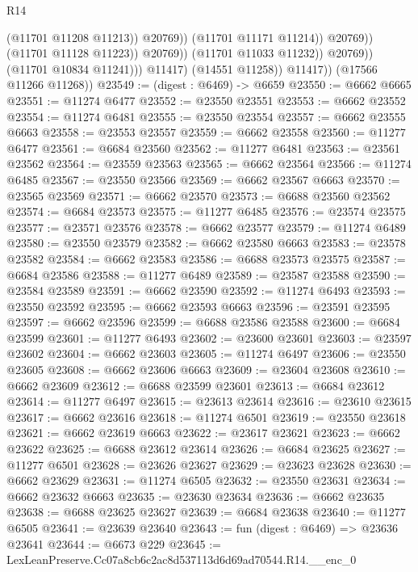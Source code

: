 \begin{lexlean}{R14}
\begin{coremodule}
                                          (@11701 @11208 @11213))
                                        @20769))
                                    (@11701 @11171 @11214))
                                  @20769))
                              (@11701 @11128 @11223))
                            @20769))
                        (@11701 @11033 @11232))
                      @20769))
                  (@11701 @10834 @11241)))
              @11417)
            (@14551 @11258))
          @11417))
      (@17566 @11266 @11268))
@23549 := (digest : @6469) -> @6659
@23550 := @6662 @6665
@23551 := @11274 @6477
@23552 := @23550 @23551
@23553 := @6662 @23552
@23554 := @11274 @6481
@23555 := @23550 @23554
@23557 := @6662 @23555 @6663
@23558 := @23553 @23557
@23559 := @6662 @23558
@23560 := @11277 @6477
@23561 := @6684 @23560
@23562 := @11277 @6481
@23563 := @23561 @23562
@23564 := @23559 @23563
@23565 := @6662 @23564
@23566 := @11274 @6485
@23567 := @23550 @23566
@23569 := @6662 @23567 @6663
@23570 := @23565 @23569
@23571 := @6662 @23570
@23573 := @6688 @23560 @23562
@23574 := @6684 @23573
@23575 := @11277 @6485
@23576 := @23574 @23575
@23577 := @23571 @23576
@23578 := @6662 @23577
@23579 := @11274 @6489
@23580 := @23550 @23579
@23582 := @6662 @23580 @6663
@23583 := @23578 @23582
@23584 := @6662 @23583
@23586 := @6688 @23573 @23575
@23587 := @6684 @23586
@23588 := @11277 @6489
@23589 := @23587 @23588
@23590 := @23584 @23589
@23591 := @6662 @23590
@23592 := @11274 @6493
@23593 := @23550 @23592
@23595 := @6662 @23593 @6663
@23596 := @23591 @23595
@23597 := @6662 @23596
@23599 := @6688 @23586 @23588
@23600 := @6684 @23599
@23601 := @11277 @6493
@23602 := @23600 @23601
@23603 := @23597 @23602
@23604 := @6662 @23603
@23605 := @11274 @6497
@23606 := @23550 @23605
@23608 := @6662 @23606 @6663
@23609 := @23604 @23608
@23610 := @6662 @23609
@23612 := @6688 @23599 @23601
@23613 := @6684 @23612
@23614 := @11277 @6497
@23615 := @23613 @23614
@23616 := @23610 @23615
@23617 := @6662 @23616
@23618 := @11274 @6501
@23619 := @23550 @23618
@23621 := @6662 @23619 @6663
@23622 := @23617 @23621
@23623 := @6662 @23622
@23625 := @6688 @23612 @23614
@23626 := @6684 @23625
@23627 := @11277 @6501
@23628 := @23626 @23627
@23629 := @23623 @23628
@23630 := @6662 @23629
@23631 := @11274 @6505
@23632 := @23550 @23631
@23634 := @6662 @23632 @6663
@23635 := @23630 @23634
@23636 := @6662 @23635
@23638 := @6688 @23625 @23627
@23639 := @6684 @23638
@23640 := @11277 @6505
@23641 := @23639 @23640
@23643 := fun (digest : @6469) => @23636 @23641
@23644 := @6673 @229
@23645 := LexLeanPreserve.Cc07a8cb6c2ac8d537113d6d69ad70544.R14.__enc_0

\end{coremodule}
\end{lexlean}
